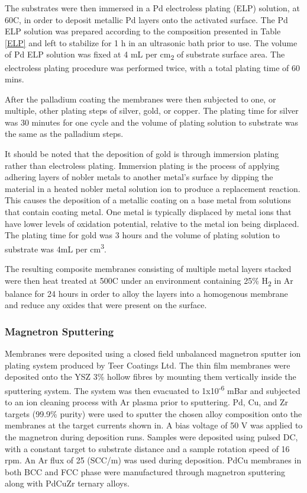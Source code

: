 The substrates were then immersed in a Pd electroless plating (ELP) solution, at 60\textdegree C, in order to deposit metallic Pd layers onto the activated surface. The Pd ELP solution was prepared according to the composition presented in Table \ref{ELP} and left to stabilize for 1 h in an ultrasonic bath prior to use. The volume of Pd ELP solution was fixed at 4 mL per cm\textsubscript{2} of 
substrate surface area. The electroless plating procedure was performed twice, with a total plating time of 60 mins.

After the palladium coating the membranes were then subjected to one, or multiple, other plating steps of silver, gold, or copper. The plating time for silver was 30 minutes for one cycle and the volume of plating solution to substrate was the same as the palladium steps.

It should be noted that the deposition of gold is through immersion plating rather than electroless plating. Immersion plating is the process of applying adhering layers of nobler metals to another metal's surface by dipping the material in a heated nobler metal solution ion to produce a replacement reaction. This causes the deposition of a metallic coating on a base metal from solutions that contain coating metal. One metal is typically displaced by metal ions that have lower levels of oxidation potential, relative to the metal ion being displaced. The plating time for gold was 3 hours and the volume of plating solution to substrate was 4mL per cm\textsuperscript{3}. 

The resulting composite membranes consisting of multiple metal layers stacked were then heat treated at 500\textdegree C under an environment containing 25\% H\textsubscript{2} in Ar balance for 24 hours in order to alloy the layers into a homogenous membrane and reduce any oxides that were present on the surface.

\subsubsection{Magnetron Sputtering}
Membranes were deposited using a closed field unbalanced magnetron sputter ion plating system produced by Teer Coatings Ltd. The thin film membranes were deposited onto the YSZ 3\% hollow fibres by mounting them vertically inside the sputtering system. The system was then evacuated to 1x10\textsuperscript{-6} mBar and subjected to an ion cleaning process with Ar plasma prior to sputtering. Pd, Cu, and Zr targets (99.9\% purity) were used to sputter the chosen alloy composition onto the membranes at the target currents shown in. A bias voltage of 50 V was applied to the magnetron during deposition runs. Samples were deposited using pulsed DC, with a constant target to substrate distance and a sample rotation speed of 16 rpm. An Ar flux of 25 (SCC/m) was used during deposition. PdCu membranes in both BCC and FCC phase were manufactured through magnetron sputtering along with PdCuZr ternary alloys. 

